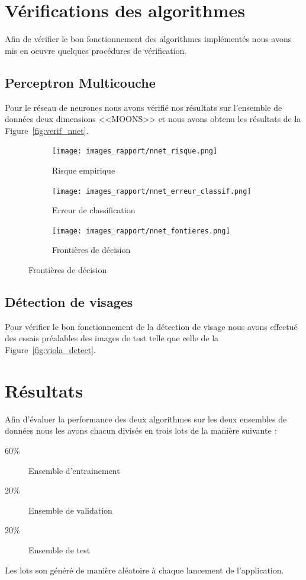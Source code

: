 \documentclass[a4paper,10pt,twocolumn]{extarticle}
\begin{document}
\section{Vérifications des algorithmes}
Afin de vérifier le bon fonctionnement des algorithmes implémentés nous avons mis en oeuvre quelques procédures de vérification.

\subsection{Perceptron Multicouche}
Pour le réseau de neurones nous avons vérifié nos résultats sur l'ensemble de données deux dimensions <<MOONS>> et nous avons obtenu les résultats de la Figure~\ref{fig:verif_nnet}.
\begin{figure}[H]
        \centering
        \caption{Vérification du réseau de neurones}\label{fig:verif_nnet}
        \begin{subfigure}[b]{220pt}
                \centering
                \caption{Risque empirique}
                \texttt{[image: images\_rapport/nnet\_risque.png]}
        \end{subfigure}
        \begin{subfigure}[b]{220pt}
                \centering
                \caption{Erreur de classification}
                \texttt{[image: images\_rapport/nnet\_erreur\_classif.png]}
        \end{subfigure}
        \begin{subfigure}[b]{220pt}
                \centering
                \caption{Frontières de décision}
                \texttt{[image: images\_rapport/nnet\_fontieres.png]}
        \end{subfigure}
\end{figure}

\subsection{Détection de visages}
Pour vérifier le bon fonctionnement de la détection de visage nous avons effectué des essais préalables des images de test telle que celle de la Figure~\ref{fig:viola_detect}.

\section{Résultats}
Afin d'évaluer la performance des deux algorithmes sur les deux ensembles de données nous les avons chacun divisés en trois lots de la manière suivante :
\begin{description}
  \item[60\%] Ensemble d'entrainement
  \item[20\%] Ensemble de validation
  \item[20\%] Ensemble de test
\end{description}
Les lots son généré de manière aléatoire à chaque lancement de l'application.
\end{document}
